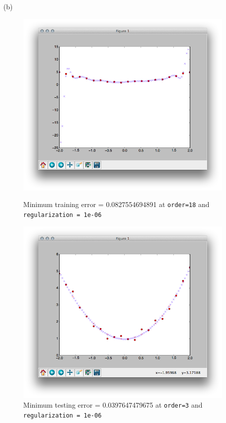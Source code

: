 \documentclass{article}
\begin{document}
\begin{enumerate}
\begin{enumerate}
\newpage

	\item[(b)] $\:$ \\
		\begin{figure}[!htb]
		  \includegraphics[width=\linewidth]{../images/Training.png}
		  \caption{Minimum training error = 0.0827554694891 at \texttt{order=18} and \texttt{regularization = 1e-06}}
		\endminipage\hfill
		  \includegraphics[width=\linewidth]{../images/Testing.png}
		  \caption{Minimum testing error = 0.0397647479675 at \texttt{order=3} and \texttt{regularization = 1e-06}}
		\endminipage\hfill
		\end{figure}
	\end{enumerate}


\end{enumerate}
\end{document}
